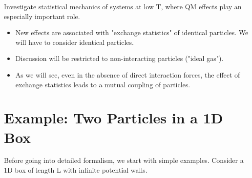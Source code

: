 \documentclass[11pt]{article}
\begin{document}
Investigate statistical mechanics of systems at low T, where QM effects play an especially important role.
\begin{itemize}
    \item New effects are associated with "exchange statistics" of identical particles. We will have to consider identical particles.
    \item Discussion will be restricted to non-interacting particles ("ideal gas").
    \item As we will see, even in the absence of direct interaction forces, the effect of exchange statistics leads to a mutual coupling of particles.
\end{itemize}

\section*{Example: Two Particles in a 1D Box}

Before going into detailed formalism, we start with simple examples.
Consider a 1D box of length L with infinite potential walls.

\begin{center}
\end{center}
\end{document}
